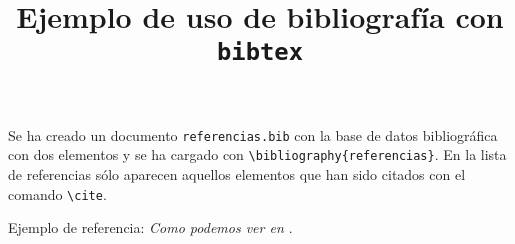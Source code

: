 \documentclass{article}
\begin{document}
\title{Ejemplo de uso de bibliografía con \texttt{bibtex}}
\maketitle

Se ha creado un documento \texttt{referencias.bib} con la base de datos bibliográfica con dos elementos y se ha cargado con \texttt{\textbackslash bibliography\{referencias\}}. En la lista de referencias sólo aparecen aquellos elementos que han sido citados con el comando \texttt{\textbackslash cite}.


Ejemplo de referencia: \emph{Como podemos ver en \cite{Euler1984}}.


\end{document}
